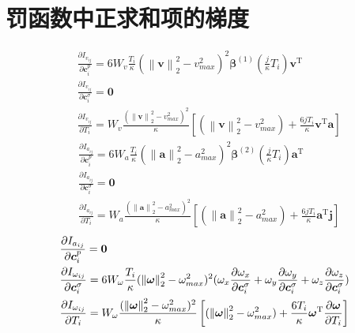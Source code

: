 
\chapter{罚函数中正求和项的梯度}\label{appdx:A}

\begin{align}
  & \frac{\partial I_{v_{ij}}}{\partial \bm{c}_i^{p}} = 
  6 W_v \frac{T_i}{\kappa} (\left\|\bm{v}\right\|_2^2 - v_{max}^2)^2 \bm{\beta}^{(1)}(\frac{j}{\kappa}T_i) \bm{v}^{\text{T}}
  \label{equ:Evdcp} \\
  & \frac{\partial I_{v_{ij}}}{\partial \bm{c}_i^{\sigma}} = \bm{0}
  \label{equ:Evdcs} \\ 
  & \frac{\partial I_{v_{ij}}}{\partial T_i} = 
  W_v \frac{(\left\|\bm{v}\right\|_2^2 - v_{max}^2)^2}{\kappa} \left[(\left\|\bm{v}\right\|_2^2 - v_{max}^2) + \frac{6jT_i}{\kappa}\bm{v}^{\text{T}}\bm{a}\right]
  \label{equ:EvdT}
\end{align}
\begin{align}
  & \frac{\partial I_{a_{ij}}}{\partial \bm{c}_i^{p}} = 
  6 W_a \frac{T_i}{\kappa} (\left\|\bm{a}\right\|_2^2 - a_{max}^2)^2 \bm{\beta}^{(2)}(\frac{j}{\kappa}T_i) \bm{a}^{\text{T}}
  \label{equ:Eadcp} \\
  & \frac{\partial I_{a_{ij}}}{\partial \bm{c}_i^{\sigma}} = \bm{0}
  \label{equ:Eadcs} \\ 
  & \frac{\partial I_{a_{ij}}}{\partial T_i} = 
  W_a \frac{(\left\|\bm{a}\right\|_2^2 - a_{max}^2)^2}{\kappa} \left[(\left\|\bm{a}\right\|_2^2 - a_{max}^2) + \frac{6jT_i}{\kappa}\bm{a}^{\text{T}}\bm{j}\right]
  \label{equ:EadT} 
\end{align}
\begin{align}
  & \frac{\partial{I_{a_{ij}}}}{\partial{\bm{c}_i^{p}}} = \textbf{0} 
  \label{equ:Eodcp} \\ 
  & \frac{\partial I_{\omega_{ij}}}{\partial \bm{c}_i^{\sigma}} = 
  6 W_{\omega} \frac{T_i}{\kappa} (\left\|\bm{\omega}\right\|_2^2 - \omega_{max}^2)^2 (\omega_x\frac{\partial{\omega_x}}{\partial{\bm{c}_i^{\sigma}}} + \omega_y\frac{\partial{\omega_y}}{\partial{\bm{c}_i^{\sigma}}} + \omega_z\frac{\partial{\omega_z}}{\partial{\bm{c}_i^{\sigma}}})
  \label{equ:Eodcs} \\ 
  & \frac{\partial I_{\omega_{ij}}}{\partial T_i} = 
  W_{\omega} \frac{(\left\|\bm{\omega}\right\|_2^2 - \omega_{max}^2)^2}{\kappa} \left[(\left\|\bm{\omega}\right\|_2^2 - \omega_{max}^2) + \frac{6T_i}{\kappa}\bm{\omega}^{\text{T}}\frac{\partial{\bm{\omega}}}{\partial{T_i}}\right]
\end{align}
